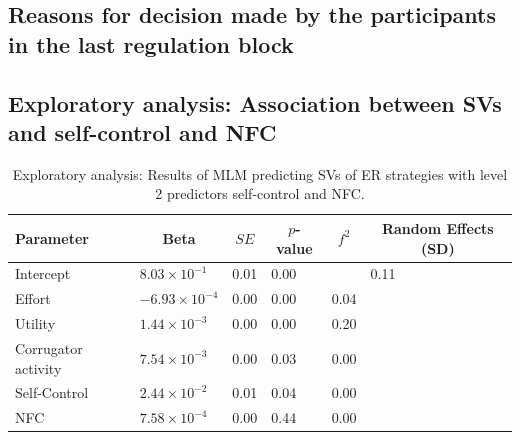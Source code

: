 \documentclass[
  man,floatsintext]{apa6}
\begin{document}
\hypertarget{reasons-for-decision-made-by-the-participants-in-the-last-regulation-block}{%
\subsection{Reasons for decision made by the participants in the last regulation block}\label{reasons-for-decision-made-by-the-participants-in-the-last-regulation-block}}

\newpage

\hypertarget{exploratory-analysis-association-between-svs-and-self-control-and-nfc}{%
\subsection{Exploratory analysis: Association between SVs and self-control and NFC}\label{exploratory-analysis-association-between-svs-and-self-control-and-nfc}}

\begin{table}[H]

\begin{center}
\begin{threeparttable}

\caption{\label{tab:TabExp}Exploratory analysis: Results of MLM predicting SVs of ER strategies with level 2 predictors self-control and NFC.}

\begin{tabular}{llllll}
\toprule
Parameter & \multicolumn{1}{c}{Beta} & \multicolumn{1}{c}{$SE$} & \multicolumn{1}{c}{$p$-value} & \multicolumn{1}{c}{$f^{2}$} & \multicolumn{1}{c}{Random Effects (SD)}\\
\midrule
Intercept & $8.03 \times 10^{-1}$ & 0.01 & 0.00 &  & 0.11\\
Effort & $-6.93 \times 10^{-4}$ & 0.00 & 0.00 & 0.04 & \\
Utility & $1.44 \times 10^{-3}$ & 0.00 & 0.00 & 0.20 & \\
Corrugator activity & $7.54 \times 10^{-3}$ & 0.00 & 0.03 & 0.00 & \\
Self-Control & $2.44 \times 10^{-2}$ & 0.01 & 0.04 & 0.00 & \\
NFC & $7.58 \times 10^{-4}$ & 0.00 & 0.44 & 0.00 & \\
\bottomrule
\end{tabular}

\end{threeparttable}
\end{center}

\end{table}
\end{document}
